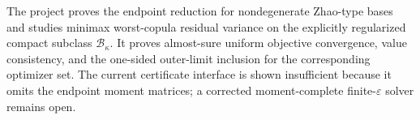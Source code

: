 The project proves the endpoint reduction for nondegenerate Zhao-type bases and studies minimax worst-copula residual variance on the explicitly regularized compact subclass \(\mathcal B_\kappa\). It proves almost-sure uniform objective convergence, value consistency, and the one-sided outer-limit inclusion for the corresponding optimizer set. The current certificate interface is shown insufficient because it omits the endpoint moment matrices; a corrected moment-complete finite-\(\varepsilon\) solver remains open.